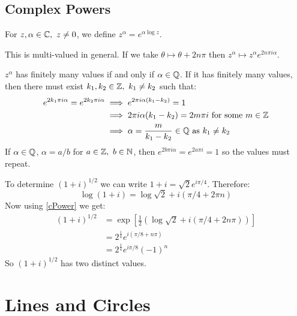 \documentclass[../main.tex]{subfiles}
\begin{document}
\subsection{Complex Powers}
\begin{definition}
  For $z, \alpha \in \mathbb{C},\ z\neq0$, we define $z^{\alpha} = e^{\alpha \log z}$.
  \label{cPower}
\end{definition}
This is multi-valued in general.
If we take $\theta \mapsto \theta + 2n\pi$ then $z^{\alpha} \mapsto z^{\alpha}e^{2n\pi i \alpha}$.
\begin{remark}
  $z^{\alpha}$ has finitely many values if and only if $\alpha \in \mathbb{Q}$.
  If it has finitely many values, then there must exist $k_1, k_2 \in \mathbb{Z},\ k_1 \neq k_2$ such that:
  \begin{align*}
    e^{2k_1 \pi i \alpha} = e^{2k_2 \pi i \alpha} &\implies e^{2 \pi i \alpha(k_1 - k_2)} = 1 \\
                                                  &\implies 2 \pi i \alpha(k_1 - k_2) = 2m\pi i \text{ for some $m \in \mathbb{Z}$} \\
                                                  &\implies \alpha = \frac{m}{k_1 - k_2} \in \mathbb{Q} \text{ as $k_1 \neq k_2$}
  \end{align*}
  If $\alpha \in \mathbb{Q}$, $\alpha = a/b$ for $a \in \mathbb{Z},\ b \in \mathbb{N}$, then $e^{2 b \pi i \alpha} = e^{2 a \pi i} = 1$ so the values must repeat.
\end{remark}
\begin{example}
  To determine $(1 + i)^{1/2}$ we can write $1 + i = \sqrt{2}e^{i\pi/4}$.
  Therefore:
  \[
    \log(1 + i) = \log \sqrt{2} + i(\pi/4 + 2\pi n)
  \]
  Now using \cref{cPower} we get:
  \begin{align*}
    (1 + i)^{1/2} &= \exp\left[\frac{1}{2}\left(\log \sqrt{2} + i(\pi/4 + 2n\pi)\right)\right] \\
                  &= 2^{\frac{1}{4}} e^{i(\pi/8 + n\pi)} \\
                  &= 2^{\frac{1}{4}} e^{i\pi/8} (-1)^{n}
  \end{align*}
  So $(1 + i)^{1/2}$ has two distinct values.
\end{example}
\section{Lines and Circles}
\end{document}
